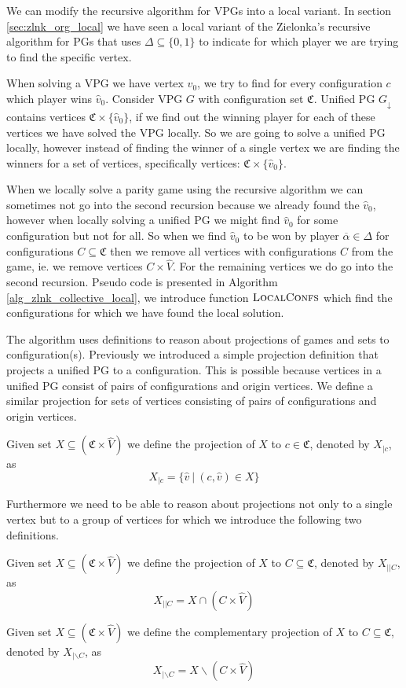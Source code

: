 We can modify the recursive algorithm for VPGs into a local variant. In section \ref{sec:zlnk_org_local} we have seen a local variant of the Zielonka's recursive algorithm for PGs that uses $\Delta \subseteq \{0,1\}$ to indicate for which player we are trying to find the specific vertex.

When solving a VPG we have vertex $\hat{v}_0$, we try to find for every configuration $c$ which player wins $\hat{v}_0$. Consider VPG $G$ with configuration set $\mathfrak{C}$. Unified PG $G_{\downarrow}$ contains vertices $\mathfrak{C} \times \{\hat{v}_0\}$, if we find out the winning player for each of these vertices we have solved the VPG locally. So we are going to solve a unified PG locally, however instead of finding the winner of a single vertex we are finding the winners for a set of vertices, specifically vertices: $\mathfrak{C} \times \{\hat{v}_0\}$.

When we locally solve a parity game using the recursive algorithm we can sometimes not go into the second recursion because we already found the $\hat{v}_0$, however when locally solving a unified PG we might find $\hat{v}_0$ for some configuration but not for all. So when we find $\hat{v}_0$ to be won by player $\overline{\alpha} \in \Delta$ for configurations $C \subseteq \mathfrak{C}$ then we remove all vertices with configurations $C$ from the game, ie. we remove vertices $C \times \hat{V}$. For the remaining vertices we do go into the second recursion. Pseudo code is presented in Algorithm \ref{alg_zlnk_collective_local}, we introduce function $\textsc{LocalConfs}$ which find the configurations for which we have found the local solution.

The algorithm uses definitions to reason about projections of games and sets to configuration(s). Previously we introduced a simple projection definition that projects a unified PG to a configuration. This is possible because vertices in a unified PG consist of pairs of configurations and origin vertices. We define a similar projection for sets of vertices consisting of pairs of configurations and origin vertices.
\begin{definition}
	Given set $X \subseteq (\mathfrak{C} \times \hat{V})$ we define the projection of $X$ to $c \in \mathfrak{C}$, denoted by $X_{|c}$, as
	\[ X_{|c} = \{ \hat{v}\ |\ (c,\hat{v}) \in X \}\]
\end{definition}
Furthermore we need to be able to reason about projections not only to a single vertex but to a group of vertices for which we introduce the following two definitions.
\begin{definition}
	Given set $X \subseteq (\mathfrak{C} \times \hat{V})$ we define the projection of $X$ to $C \subseteq \mathfrak{C}$, denoted by $X_{||C}$, as
	\[ X_{||C} = X \cap (C \times \hat{V}) \]
\end{definition}
\begin{definition}
Given set $X \subseteq (\mathfrak{C} \times \hat{V})$ we define the complementary projection of $X$ to $C \subseteq \mathfrak{C}$, denoted by $X_{|\backslash C}$, as
\[ X_{|\backslash C} = X \backslash (C \times \hat{V}) \]
\end{definition}


